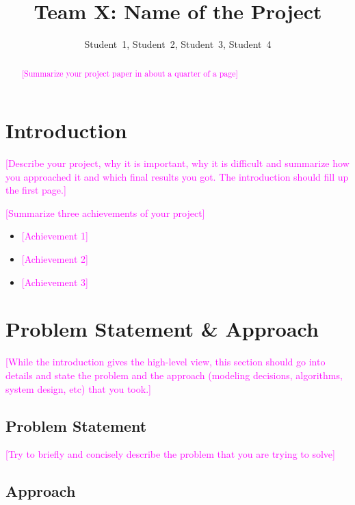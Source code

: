 \documentclass[sigconf,10pt]{acmart}
\title{Team X: Name of the Project}
\author{Student~1, Student~2, Student~3, Student~4}
\affiliation{%
  \institution{New York University}
}
\newcommand{\todo}[1]{\textcolor{magenta}{[#1]}}
\begin{document}
\begin{abstract}
\todo{Summarize your project paper in about a quarter of a page} \blindtext
\end{abstract}

\maketitle

\section{Introduction}

\todo{Describe your project, why it is important, why it is difficult and summarize how you approached it and which final results you got. The introduction should fill up the first page.}

\blindtext

\blindtext

\blindtext

\blindtext

\todo{Summarize three achievements of your project}
\begin{itemize}
  \item \todo{Achievement 1}
  \item \todo{Achievement 2}
  \item \todo{Achievement 3} 
\end{itemize}  

\newpage

\section{Problem Statement \& Approach}

\todo{While the introduction gives the high-level view, this section should go into details and state the problem and the approach (modeling decisions, algorithms, system design, etc) that you took.}

\subsection{Problem Statement}

\todo{Try to briefly and concisely describe the problem that you are trying to solve}

\blindtext

\blindtext

\subsection{Approach}
\end{document}
